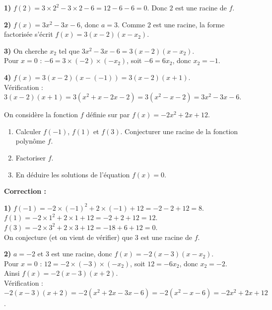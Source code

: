 \documentclass[11pt,a4paper]{book}
\begin{document}
\smallskip
\begin{corrBox}
	\textbf{1)} $f(2)=3\times2^2-3\times2-6=12-6-6=0$. Donc $2$ est une racine de $f$.
\end{corrBox}

\medskip
\begin{corrBox}
	\textbf{2)} $f(x)=3x^2-3x-6$, donc $a=3$. Comme $2$ est une racine, la forme factorisée s'écrit $f(x)=3(x-2)(x-x_2)$.
\end{corrBox}

\medskip
\begin{corrBox}
	\textbf{3)} On cherche $x_2$ tel que $3x^2-3x-6=3(x-2)(x-x_2)$.\\
	Pour $x=0$ : $-6=3\times(-2)\times(-x_2)$, soit $-6=6x_2$, donc $x_2=-1$.
\end{corrBox}

\medskip
\begin{corrBox}
	\textbf{4)} $f(x)=3(x-2)(x-(-1))=3(x-2)(x+1)$.\\
	Vérification : $3(x-2)(x+1)=3\left(x^2+x-2x-2\right)=3\left(x^2-x-2\right)=3x^2-3x-6$. \checkmark
\end{corrBox}

\exerciceDS{}

On considère la fonction $f$ définie sur \R par $f(x)=-2x^2+2x+12$.

\begin{enumerate}[label=\textbf{\arabic*)}]
	\item Calculer $f(-1)$, $f(1)$ et $f(3)$. Conjecturer une racine de la fonction polynôme $f$.
	\item Factoriser $f$.
	\item En déduire les solutions de l'équation $f(x)=0$.
\end{enumerate}

\medskip
\noindent\textbf{\color{red!75!black}Correction :}

\smallskip
\begin{corrBox}
	\textbf{1)} $f(-1)=-2\times(-1)^2+2\times(-1)+12=-2-2+12=8$.\\
	$f(1)=-2\times1^2+2\times1+12=-2+2+12=12$.\\
	$f(3)=-2\times3^2+2\times3+12=-18+6+12=0$.\\
	On conjecture (et on vient de vérifier) que $3$ est une racine de $f$.
\end{corrBox}

\medskip
\begin{corrBox}
	\textbf{2)} $a=-2$ et $3$ est une racine, donc $f(x)=-2(x-3)(x-x_2)$.\\
	Pour $x=0$ : $12=-2\times(-3)\times(-x_2)$, soit $12=-6x_2$, donc $x_2=-2$.\\
	Ainsi $f(x)=-2(x-3)(x+2)$.\\
	Vérification : $-2(x-3)(x+2)=-2\left(x^2+2x-3x-6\right)=-2\left(x^2-x-6\right)=-2x^2+2x+12$. \checkmark
\end{corrBox}
\end{document}
